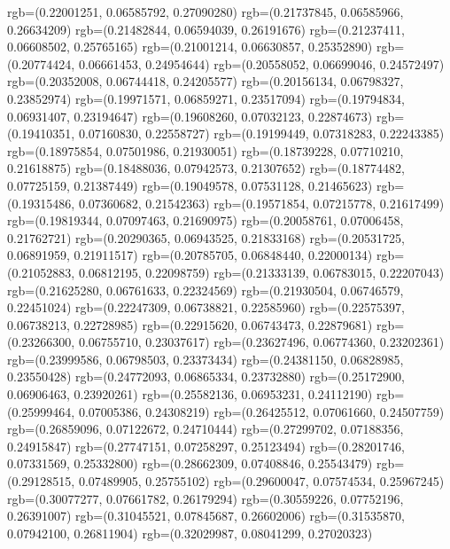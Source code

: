 {{        rgb=(0.22001251, 0.06585792, 0.27090280)
        rgb=(0.21737845, 0.06585966, 0.26634209)
        rgb=(0.21482844, 0.06594039, 0.26191676)
        rgb=(0.21237411, 0.06608502, 0.25765165)
        rgb=(0.21001214, 0.06630857, 0.25352890)
        rgb=(0.20774424, 0.06661453, 0.24954644)
        rgb=(0.20558052, 0.06699046, 0.24572497)
        rgb=(0.20352008, 0.06744418, 0.24205577)
        rgb=(0.20156134, 0.06798327, 0.23852974)
        rgb=(0.19971571, 0.06859271, 0.23517094)
        rgb=(0.19794834, 0.06931407, 0.23194647)
        rgb=(0.19608260, 0.07032123, 0.22874673)
        rgb=(0.19410351, 0.07160830, 0.22558727)
        rgb=(0.19199449, 0.07318283, 0.22243385)
        rgb=(0.18975854, 0.07501986, 0.21930051)
        rgb=(0.18739228, 0.07710210, 0.21618875)
        rgb=(0.18488036, 0.07942573, 0.21307652)
        rgb=(0.18774482, 0.07725159, 0.21387449)
        rgb=(0.19049578, 0.07531128, 0.21465623)
        rgb=(0.19315486, 0.07360682, 0.21542363)
        rgb=(0.19571854, 0.07215778, 0.21617499)
        rgb=(0.19819344, 0.07097463, 0.21690975)
        rgb=(0.20058761, 0.07006458, 0.21762721)
        rgb=(0.20290365, 0.06943525, 0.21833168)
        rgb=(0.20531725, 0.06891959, 0.21911517)
        rgb=(0.20785705, 0.06848440, 0.22000134)
        rgb=(0.21052883, 0.06812195, 0.22098759)
        rgb=(0.21333139, 0.06783015, 0.22207043)
        rgb=(0.21625280, 0.06761633, 0.22324569)
        rgb=(0.21930504, 0.06746579, 0.22451024)
        rgb=(0.22247309, 0.06738821, 0.22585960)
        rgb=(0.22575397, 0.06738213, 0.22728985)
        rgb=(0.22915620, 0.06743473, 0.22879681)
        rgb=(0.23266300, 0.06755710, 0.23037617)
        rgb=(0.23627496, 0.06774360, 0.23202361)
        rgb=(0.23999586, 0.06798503, 0.23373434)
        rgb=(0.24381150, 0.06828985, 0.23550428)
        rgb=(0.24772093, 0.06865334, 0.23732880)
        rgb=(0.25172900, 0.06906463, 0.23920261)
        rgb=(0.25582136, 0.06953231, 0.24112190)
        rgb=(0.25999464, 0.07005386, 0.24308219)
        rgb=(0.26425512, 0.07061660, 0.24507759)
        rgb=(0.26859096, 0.07122672, 0.24710444)
        rgb=(0.27299702, 0.07188356, 0.24915847)
        rgb=(0.27747151, 0.07258297, 0.25123494)
        rgb=(0.28201746, 0.07331569, 0.25332800)
        rgb=(0.28662309, 0.07408846, 0.25543479)
        rgb=(0.29128515, 0.07489905, 0.25755102)
        rgb=(0.29600047, 0.07574534, 0.25967245)
        rgb=(0.30077277, 0.07661782, 0.26179294)
        rgb=(0.30559226, 0.07752196, 0.26391007)
        rgb=(0.31045521, 0.07845687, 0.26602006)
        rgb=(0.31535870, 0.07942100, 0.26811904)
        rgb=(0.32029987, 0.08041299, 0.27020323)
}}

